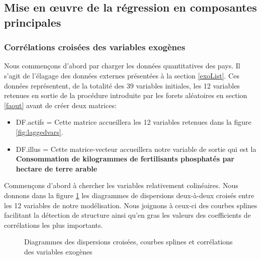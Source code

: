 	\subsection{Mise en œuvre de la régression en composantes principales}
	\subsubsection{Corrélations croisées des variables exogènes}
	Nous commençons d'abord par charger les données quantitatives des pays. Il s'agit de l'élagage des données externes présentées à la section \ref{exoList}. Ces données représentent, de la totalité des 39 variables initiales, les 12 variables retenues en sortie de la procédure introduite par les forets aléatoires en section \ref{faout} avant de créer deux matrices:\begin{itemize}
	\item DF.actifs = Cette matrice accueillera les 12 variables retenues dans la figure \ref{fig:laggedvars}.
	\item DF.illus = Cette matrice-vecteur accueillera notre variable de sortie qui est la \textbf{Consommation de kilogrammes de fertilisants phosphatés par hectare de terre arable} 
	\end{itemize}
	Commençons d'abord à chercher les variables relativement colinéaires. Nous donnons dans la figure \ref{fig:scatter} les diagrammes de dispersions deux-à-deux croisés entre les 12 variables de notre modélisation. Nous joignons à ceux-ci des courbes splines facilitant la détection de structure ainsi qu'en gras les valeurs des coefficients de corrélations les plus importants.
			\begin{figure}[h]
				    		\centering
				    		\caption{Diagrammes des dispersions croisées, courbes splines et corrélations des variables exogènes}
				    		\label{fig:scatter}
			\end{figure}
